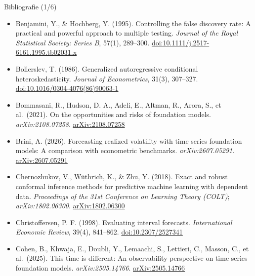 \begin{frame}{Bibliografie (1/6)}
\begin{itemize}
    \item Benjamini, Y., \& Hochberg, Y. (1995). Controlling the false discovery rate: A practical and powerful approach to multiple testing. \textit{Journal of the Royal Statistical Society: Series B}, 57(1), 289--300. \href{https://doi.org/10.1111/j.2517-6161.1995.tb02031.x}{doi:10.1111/j.2517-6161.1995.tb02031.x}
    \item Bollerslev, T. (1986). Generalized autoregressive conditional heteroskedasticity. \textit{Journal of Econometrics}, 31(3), 307--327. \href{https://doi.org/10.1016/0304-4076(86)90063-1}{doi:10.1016/0304-4076(86)90063-1}
    \item Bommasani, R., Hudson, D. A., Adeli, E., Altman, R., Arora, S., et al.\ (2021). On the opportunities and risks of foundation models. \textit{arXiv:2108.07258}. \href{https://arxiv.org/abs/2108.07258}{arXiv:2108.07258}
    \item Brini, A. (2026). Forecasting realized volatility with time series foundation models: A comparison with econometric benchmarks. \textit{arXiv:2607.05291}. \href{https://arxiv.org/abs/2607.05291}{arXiv:2607.05291}
    \item Chernozhukov, V., Wüthrich, K., \& Zhu, Y. (2018). Exact and robust conformal inference methods for predictive machine learning with dependent data. \textit{Proceedings of the 31st Conference on Learning Theory (COLT)}; \textit{arXiv:1802.06300}. \href{https://arxiv.org/abs/1802.06300}{arXiv:1802.06300}
    \item Christoffersen, P. F. (1998). Evaluating interval forecasts. \textit{International Economic Review}, 39(4), 841--862. \href{https://doi.org/10.2307/2527341}{doi:10.2307/2527341}
    \item Cohen, B., Khwaja, E., Doubli, Y., Lemaachi, S., Lettieri, C., Masson, C., et al.\ (2025). This time is different: An observability perspective on time series foundation models. \textit{arXiv:2505.14766}. \href{https://arxiv.org/abs/2505.14766}{arXiv:2505.14766}
\end{itemize}
\end{frame}


